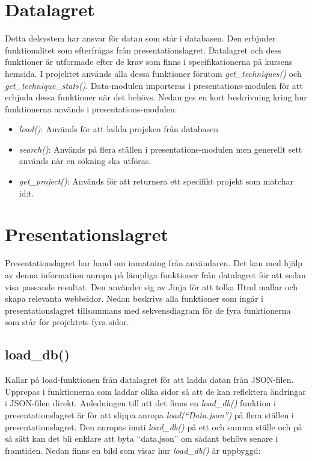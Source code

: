 \documentclass{TDP003mall}
\begin{document}
\section{Datalagret}
Detta delsystem har ansvar för datan som står i databasen. Den erbjuder funktionalitet som efterfrågas från presentationslagret. Datalagret och dess funktioner
är utformade efter de krav som finns i specifikationerna på kursens hemsida. I projektet används alla dessa funktioner förutom \textit{get\_techniques()} och
\textit{get\_technique\_stats()}. Data-modulen importeras i presentations-modulen för att erbjuda dessa funktioner när det behövs. Nedan ges en kort beskrivning kring hur funktionerna används i presentations-modulen:
\begin{itemize}
\item \textit{load()}: Används för att ladda projeken från databasen
\item \textit{search()}: Används på flera ställen i presentations-modulen men generellt sett används när en sökning ska utföras.
\item \textit{get\_project()}: Används för att returnera ett specifikt projekt som matchar id:t. 
 \end{itemize}

\section{Presentationslagret}
Presentationslagret har hand om inmatning från användaren. Det kan med hjälp av denna information anropa på lämpliga funktioner från datalagret för att sedan visa
passande resultat. Den använder sig av Jinja för att tolka Html mallar och skapa relevanta webbsidor.
Nedan beskrivs alla funktioner som ingår i presentationslagret tillsammans med sekvensdiagram för de fyra funktionerna som står för projektets fyra sidor.

\subsection{load\_db()}
Kallar på load-funktionen från datalagret för att ladda datan från JSON-filen. Upprepas i funktionerna som laddar olika sidor så att de kan reflektera ändringar i JSON-filen
direkt. Anledningen till att det finns en \textit{load\_db()} funktion i presentationslagret är för att slippa anropa \textit{load(``Data.json'')} på flera ställen i presentationslagret.
Den anropas inuti \textit{load\_db()} på ett och samma ställe och på så sätt kan det bli enklare att byta ``data.json'' om sådant behövs senare i framtiden. Nedan finns en bild som
visar hur \textit{load\_db()} är uppbyggd:
\end{document}

